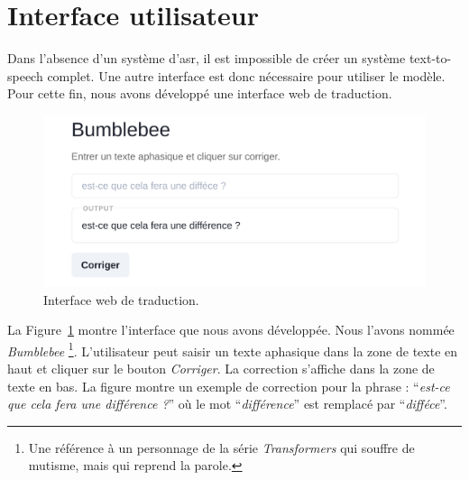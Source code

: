 \section{Interface utilisateur}%
\label{sec.results.interface}


Dans l'absence d'un système d'\gls{asr}, 
il est impossible de créer un système \foreignlanguage{english}{text-to-speech} complet.
Une autre interface est donc nécessaire pour utiliser le modèle.
Pour cette fin, nous avons développé une interface web de traduction.

\begin{figure}[hbt]
    \begin{center}
        \includegraphics[width=.8\linewidth]{assets/images/interface.png}
    \end{center}
    \caption{Interface web de traduction.}%
    \label{fig.interface}
\end{figure}

La Figure~\ref{fig.interface} montre l'interface que nous avons développée.
Nous l'avons nommée \textit{Bumblebee}%
\footnote{Une référence à un personnage de la série \textit{Transformers} qui souffre de mutisme, 
mais qui reprend la parole.}.
L'utilisateur peut saisir un texte aphasique dans la zone de texte en haut 
et cliquer sur le bouton \textit{Corriger}.
La correction s'affiche dans la zone de texte en bas.
La figure montre un exemple de correction pour la phrase : ``\textit{est-ce que cela fera une différence ?}''
où le mot ``\textit{différence}'' est remplacé par ``\textit{difféce}''.